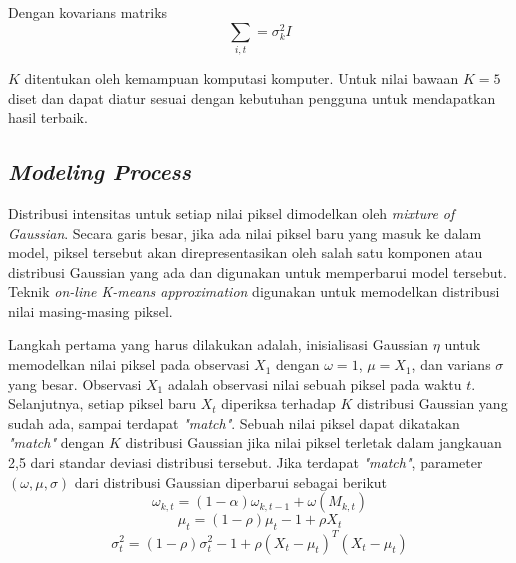         Dengan kovarians matriks
        \begin{equation}\label{eq:2.7}
        \text{$\sum$}_{i, t} = \sigma^2_k I
        \end{equation}
        
        $K$ ditentukan oleh kemampuan komputasi komputer. Untuk nilai bawaan $K =  5$ diset dan dapat diatur sesuai dengan kebutuhan pengguna untuk mendapatkan hasil terbaik.
        
    \subsection{\textit{Modeling Process}}
        Distribusi intensitas untuk setiap nilai piksel dimodelkan oleh \textit{mixture of Gaussian}. Secara garis besar, jika ada nilai piksel baru yang masuk ke dalam model, piksel tersebut akan direpresentasikan oleh salah satu komponen atau distribusi Gaussian yang ada dan digunakan untuk memperbarui model tersebut. Teknik \textit{on-line K-means approximation} digunakan untuk memodelkan distribusi nilai masing-masing piksel.
        
        Langkah pertama yang harus dilakukan adalah, inisialisasi Gaussian $\eta$ untuk memodelkan nilai piksel pada observasi $X_1$ dengan $\omega = 1$, $\mu = X_1$, dan varians $\sigma$ yang besar. Observasi $X_1$ adalah observasi nilai sebuah piksel pada waktu $t$. Selanjutnya, setiap piksel baru $X_t$ diperiksa terhadap $K$ distribusi Gaussian yang sudah ada, sampai terdapat \textit{"match"}. Sebuah nilai piksel dapat dikatakan \textit{"match"} dengan $K$ distribusi Gaussian jika nilai piksel terletak dalam jangkauan 2,5 dari standar deviasi distribusi tersebut. Jika terdapat \textit{"match"}, parameter $(\omega, \mu, \sigma)$ dari distribusi Gaussian diperbarui sebagai berikut
        \begin{equation}\label{eq:2.8}
        \omega_{k, t} = (1 - \alpha)\omega_{k, t-1} + \omega(M_{k, t})
        \end{equation}
        \begin{equation}\label{eq:2.9}
        \mu_t = (1 - \rho)\mu_t-1 + \rho X_t
        \end{equation}
        \begin{equation}\label{eq:2.10}
        \sigma^2_t = (1 - \rho)\sigma^2_t-1 + \rho (X_t - \mu_t)^T (X_t - \mu_t)
        \end{equation}
        \vspace{0.005cm}
        
